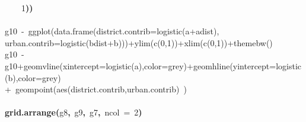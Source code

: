 \documentclass{article}
\makeatletter
\newcommand{\hlnumber}[1]{\textcolor[rgb]{0,0,0}{#1}}%
\newcommand{\hlfunctioncall}[1]{\textcolor[rgb]{.5,0,.33}{\textbf{#1}}}%
\newcommand{\hlkeyword}[1]{\textbf{#1}}%
\newcommand{\hlargument}[1]{\textcolor[rgb]{.69,.25,.02}{#1}}%
\newcommand{\hlcomment}[1]{\textcolor[rgb]{.18,.6,.34}{#1}}%
\newcommand{\hlsymbol}[1]{#1}%
\newcommand{\hlstd}[1]{\textcolor[rgb]{0,0,0}{#1}}%
\newenvironment{kframe}{%
 \def\FrameCommand##1{\hskip\@totalleftmargin \hskip-\fboxsep
 \colorbox{shadecolor}{##1}\hskip-\fboxsep
     \hskip-\linewidth \hskip-\@totalleftmargin \hskip\columnwidth}%
 \MakeFramed {\advance\hsize-\width
   \@totalleftmargin\z@ \linewidth\hsize
   \@setminipage}}%
 {\par\unskip\endMakeFramed}
\newenvironment{knitrout}{}{} %
\makeatother
\begin{document}
\begin{knitrout}
{\begin{kframe}
\begin{flushleft}
\hlstd{}{\ }{\ }{\ }{\ }\hlnumber{1}\hlkeyword{)}\hlkeyword{)}\hspace*{\fill}\\
\hlstd{}\hspace*{\fill}\\
\hlstd{}\hlcomment{\usebox{\hlnormalsizeboxhash}g10{\ }\usebox{\hlnormalsizeboxlessthan}-{\ }ggplot(data.frame(district.contrib=logistic(a+a\usebox{\hlnormalsizeboxunderscore}dist),}\hspace*{\fill}\\
\hlstd{}\hlcomment{\usebox{\hlnormalsizeboxhash}{\ }{\ }{\ }urban.contrib=logistic(b\usebox{\hlnormalsizeboxunderscore}dist+b)))+ylim(c(0,1))+xlim(c(0,1))+theme\usebox{\hlnormalsizeboxunderscore}bw()}\hspace*{\fill}\\
\hlstd{}\hlcomment{\usebox{\hlnormalsizeboxhash}g10{\ }\usebox{\hlnormalsizeboxlessthan}-}\hspace*{\fill}\\
\hlstd{}\hlcomment{\usebox{\hlnormalsizeboxhash}{\ }{\ }{\ }g10+geom\usebox{\hlnormalsizeboxunderscore}vline(xintercept=logistic(a),color=\usebox{\hlnormalsizeboxsinglequote}grey\usebox{\hlnormalsizeboxsinglequote})+geom\usebox{\hlnormalsizeboxunderscore}hline(yintercept=logistic(b),color=\usebox{\hlnormalsizeboxsinglequote}grey\usebox{\hlnormalsizeboxsinglequote})}\hspace*{\fill}\\
\hlstd{}\hlcomment{\usebox{\hlnormalsizeboxhash}{\ }{\ }{\ }+{\ }geom\usebox{\hlnormalsizeboxunderscore}point(aes(district.contrib,urban.contrib){\ })}\hspace*{\fill}\\
\hlstd{}\hspace*{\fill}\\
\hlstd{}\hlfunctioncall{grid.arrange}\hlkeyword{(}\hlsymbol{g8}\hlkeyword{,}{\ }\hlsymbol{g9}\hlkeyword{,}{\ }\hlsymbol{g7}\hlkeyword{,}{\ }\hlargument{ncol}{\ }\hlargument{=}{\ }\hlnumber{2}\hlkeyword{)}\mbox{}
\normalfont
\end{flushleft}

\end{kframe}}
\end{knitrout}
\end{document}

